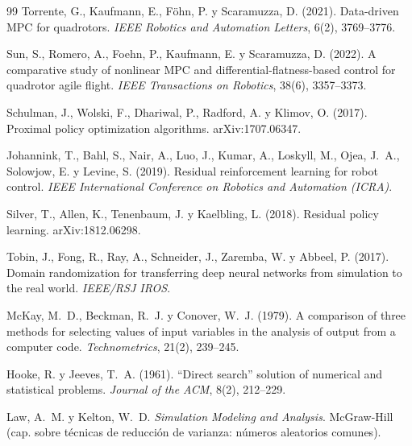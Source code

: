\begin{thebibliography}{99}
 Torrente, G., Kaufmann, E., Föhn, P. y Scaramuzza, D.
(2021). Data-driven MPC for quadrotors. \emph{IEEE Robotics and Automation
Letters}, 6(2), 3769--3776.

 Sun, S., Romero, A., Foehn, P., Kaufmann, E. y Scaramuzza, D.
(2022). A comparative study of nonlinear MPC and differential-flatness-based
control for quadrotor agile flight. \emph{IEEE Transactions on Robotics},
38(6), 3357--3373.

 Schulman, J., Wolski, F., Dhariwal, P., Radford, A. y
Klimov, O. (2017). Proximal policy optimization algorithms.
arXiv:1707.06347.

 Johannink, T., Bahl, S., Nair, A., Luo, J., Kumar, A.,
Loskyll, M., Ojea, J.~A., Solowjow, E. y Levine, S. (2019). Residual
reinforcement learning for robot control. \emph{IEEE International
Conference on Robotics and Automation (ICRA)}.

 Silver, T., Allen, K., Tenenbaum, J. y Kaelbling, L.
(2018). Residual policy learning. arXiv:1812.06298.

 Tobin, J., Fong, R., Ray, A., Schneider, J., Zaremba, W. y
Abbeel, P. (2017). Domain randomization for transferring deep neural
networks from simulation to the real world. \emph{IEEE/RSJ IROS}.

 McKay, M.~D., Beckman, R.~J. y Conover, W.~J. (1979). A
comparison of three methods for selecting values of input variables in the
analysis of output from a computer code. \emph{Technometrics}, 21(2),
239--245.

 Hooke, R. y Jeeves, T.~A. (1961). ``Direct search''
solution of numerical and statistical problems. \emph{Journal of the ACM},
8(2), 212--229.

 Law, A.~M. y Kelton, W.~D. \emph{Simulation Modeling and
Analysis}. McGraw-Hill (cap. sobre técnicas de reducción de varianza:
números aleatorios comunes).

\end{thebibliography}
